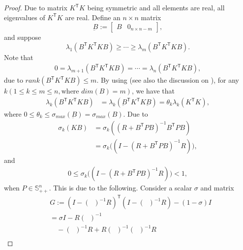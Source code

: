 \documentclass[letterpaper, 10 pt, conference]{ieeeconf}  %
\newcommand{\transpose}{\mathsf{T}}
\DeclareMathOperator{\tempRBP}{R + B^{\transpose}PB}
\begin{document}
\begin{proof}
    Due to matrix $K^{\transpose}K$ being symmetric and all elements are real, all eigenvalues of $K^{\transpose}K$ are real.
    Define an $n\times n$ matrix
    \begin{equation}
        \underbar{B} := 
        \begin{bmatrix}
            B & 0_{n\times n-m}
        \end{bmatrix},
    \end{equation}
    and suppose
    \begin{equation}
        \lambda_{1}(B^{\transpose}K^{\transpose}KB) \geq \cdots \geq \lambda_{m}(B^{\transpose}K^{\transpose}KB).
    \end{equation}
    Note that
    \begin{align*}
       0 =  \lambda_{m+1}(B^{\transpose}K^{\transpose}KB) = \cdots = \lambda_{n}(B^{\transpose}K^{\transpose}KB),
    \end{align*}
    due to $\textit{rank}(B^{\transpose}K^{\transpose}KB) \leq m$.
    By using \cite[Theorem 4.5.9]{horn_matrix_2013} (see also the discussion on \cite[p.~284]{horn_matrix_2013}), for any $k(1\leq k\leq m\leq n,\text{where $\textit{dim}(B)=m$})$,
    we have that
    \begin{align*}
        \lambda_{k}(B^{\transpose}K^{\transpose}KB) &= \lambda_{k}(\underbar{B}^{\transpose}K^{\transpose}K\underbar{B})= \theta_{k}\lambda_{k}(K^{\transpose}K),
    \end{align*}
    where $0\leq \theta_{k} \leq \sigma_{max}(\underbar{B})=\sigma_{max}(B)$.
    Due to
    \begin{align*}
        \sigma_{k}(KB) &= \sigma_{k}((R+B^{\transpose}PB)^{-1}B^{\transpose}PB)\\
        &= \sigma_{k}\bigg((I - (R+B^{\transpose}PB)^{-1}R) \bigg),
    \end{align*}
    and
    \begin{align*}
       0 \leq \sigma_{k}\bigg((I - (R+B^{\transpose}PB)^{-1}R) \bigg) < 1,
    \end{align*}
    when $P \in \mathbb{S}_{++}^{n}$. This is due to the following. Consider a scalar $\sigma$ and matrix
    \begin{align*}
        &G := (I-(\tempRBP)^{-1}R)^{\transpose}(I-(\tempRBP)^{-1}R) - (1-\sigma) I \\
        &= \sigma I - R(\tempRBP)^{-1} \\
        &\quad - (\tempRBP)^{-1}R + R(\tempRBP)^{-1}(\tempRBP)^{-1}R\\

\end{align*}
\end{proof}
\end{document}
